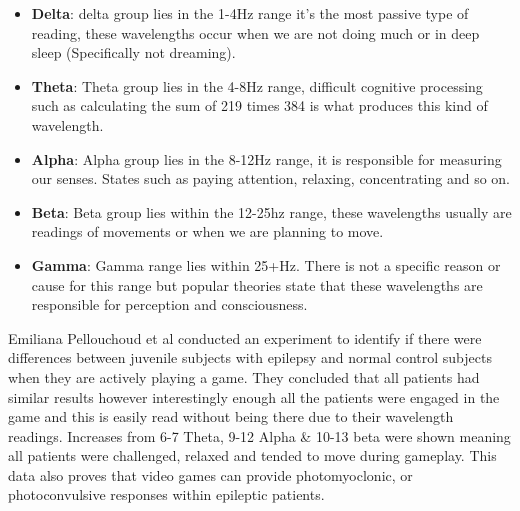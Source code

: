 \documentclass[twocolumn, 10pt, conference]{ieeetran}
\begin{document}
\begin{itemize}
	\item \textbf{Delta}: delta group lies in the 1-4Hz range it’s the most passive type of reading, these wavelengths occur when we are not doing much or in deep sleep (Specifically not dreaming).
	\item \textbf{Theta}: Theta group lies in the 4-8Hz range, difficult cognitive processing such as calculating the sum of 219 times 384 is what produces this kind of wavelength.
	\item \textbf{Alpha}: Alpha group lies in the 8-12Hz range, it is responsible for measuring our senses. States such as paying attention, relaxing, concentrating and so on. 
	\item \textbf{Beta}: Beta group lies within the 12-25hz range, these wavelengths usually are readings of movements or when we are planning to move.
	\item \textbf{Gamma}: Gamma range lies within 25+Hz. There is not a specific reason or cause for this range but popular theories state that these wavelengths are responsible for perception and consciousness. \cite{kane2017revised}
\end{itemize}
Emiliana Pellouchoud et al conducted an experiment to identify if there were differences between juvenile subjects with epilepsy and normal control subjects when they are actively playing a game. They concluded that all patients had similar results however interestingly enough all the patients were engaged in the game and this is easily read without being there due to their wavelength readings. Increases from 6-7 Theta, 9-12 Alpha \& 10-13 beta were shown meaning all patients were challenged, relaxed and tended to move during gameplay.\cite{pellouchoud1999mental} This data also proves that video games can provide photomyoclonic, or photoconvulsive responses within epileptic patients.
\end{document}
